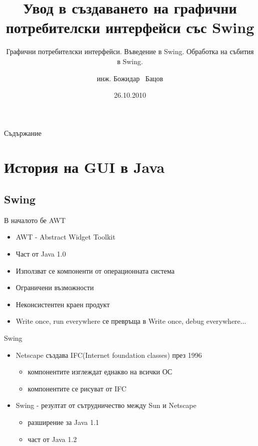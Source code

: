 \documentclass{beamer}
\title{Увод в създаването на графични потребителски интерфейси със Swing}
\subtitle
{Графични потребителски интерфейси. Въведение в Swing. Обработка на
  събития в Swing.}
\author{инж. Божидар ~Бацов}
\institute{Drow Ltd.}
\date{26.10.2010}
\begin{document}
\begin{frame}
  \titlepage
\end{frame}

\begin{frame}{Съдържание}
  \tableofcontents
\end{frame}




\section{История на GUI в Java}

\subsection{Swing}

\begin{frame}{В началото бе AWT}
  \begin{itemize}
  \item AWT - Abstract Widget Toolkit
  \item Част от Java 1.0
  \item Използват се компоненти от операционната система
  \item Ограничени възможности
  \item Неконсистентен краен продукт
  \item Write once, run everywhere се превръща в Write once, debug everywhere...
  \end{itemize}
\end{frame}

\begin{frame}{Swing}
  \transdissolve
  \begin{itemize}
  \item Netscape създава IFC(Internet foundation classes) през 1996
    \begin{itemize}
      \item компонентите изглеждат еднакво на всички ОС
      \item компонентите се рисуват от IFC
    \end{itemize}
  \item Swing - резултат от сътрудничество между Sun и Netscape
    \begin{itemize}
      \item разширение за Java 1.1
      \item част от Java 1.2
    \end{itemize}

  \end{itemize}
\end{frame}
\end{document}
